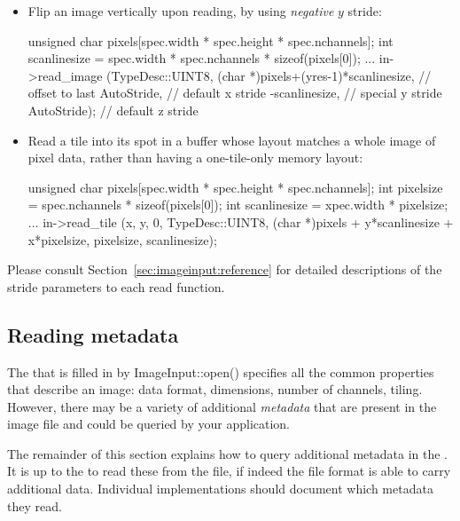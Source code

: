 \begin{itemize}
\item Flip an image vertically upon reading, by using \emph{negative}
  $y$ stride:
  \begin{code}
        unsigned char pixels[spec.width * spec.height * spec.nchannels];
        int scanlinesize = spec.width * spec.nchannels * sizeof(pixels[0]);
        ...
        in->read_image (TypeDesc::UINT8,
                        (char *)pixels+(yres-1)*scanlinesize, // offset to last
                        AutoStride,                  // default x stride
                        -scanlinesize,               // special y stride
                        AutoStride);                 // default z stride
  \end{code}
\item Read a tile into its spot in a buffer whose layout matches
  a whole image of pixel data,
  rather than having a one-tile-only memory layout:
  \begin{code}
        unsigned char pixels[spec.width * spec.height * spec.nchannels];
        int pixelsize = spec.nchannels * sizeof(pixels[0]);
        int scanlinesize = xpec.width * pixelsize;
        ...
        in->read_tile (x, y, 0, TypeDesc::UINT8,
                       (char *)pixels + y*scanlinesize + x*pixelsize,
                       pixelsize,
                       scanlinesize);
  \end{code}
\end{itemize}

Please consult Section~\ref{sec:imageinput:reference} for detailed
descriptions of the stride parameters to each {\cf read} function.


\subsection{Reading metadata}
\label{sec:imageinput:metadata}

The \ImageSpec that is filled in by {\cf ImageInput::open()}
specifies all the common properties that describe an image: data format,
dimensions, number of channels, tiling.  However, there may be a variety
of additional \emph{metadata} that are present in the image file and
could be queried by your application.

The remainder of this section explains how to query additional metadata
in the \ImageSpec.  It is up to the \ImageInput to read these
from the file, if indeed the file format is able to carry additional
data.  Individual \ImageInput implementations should document which
metadata they read.

